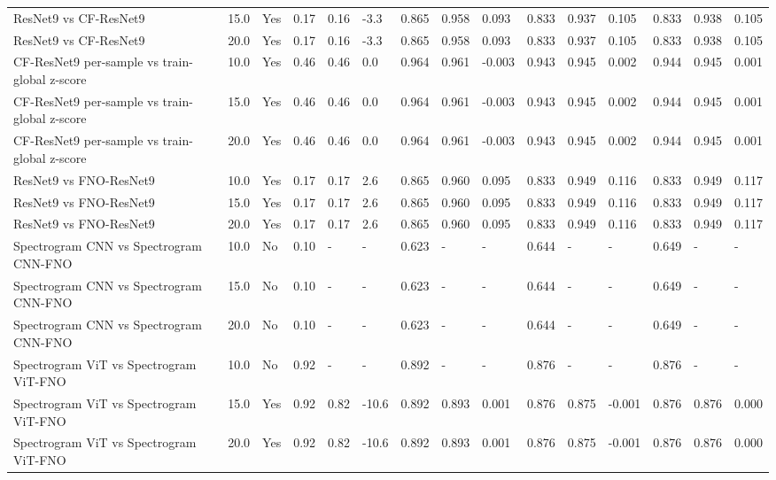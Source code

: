 \begin{longtable}{lllllllllllllll}
ResNet9 vs CF-ResNet9 & 15.0 & Yes & 0.17 & 0.16 & -3.3 & 0.865 & 0.958 & 0.093 & 0.833 & 0.937 & 0.105 & 0.833 & 0.938 & 0.105 \\
ResNet9 vs CF-ResNet9 & 20.0 & Yes & 0.17 & 0.16 & -3.3 & 0.865 & 0.958 & 0.093 & 0.833 & 0.937 & 0.105 & 0.833 & 0.938 & 0.105 \\
CF-ResNet9 per-sample vs train-global z-score & 10.0 & Yes & 0.46 & 0.46 & 0.0 & 0.964 & 0.961 & -0.003 & 0.943 & 0.945 & 0.002 & 0.944 & 0.945 & 0.001 \\
CF-ResNet9 per-sample vs train-global z-score & 15.0 & Yes & 0.46 & 0.46 & 0.0 & 0.964 & 0.961 & -0.003 & 0.943 & 0.945 & 0.002 & 0.944 & 0.945 & 0.001 \\
CF-ResNet9 per-sample vs train-global z-score & 20.0 & Yes & 0.46 & 0.46 & 0.0 & 0.964 & 0.961 & -0.003 & 0.943 & 0.945 & 0.002 & 0.944 & 0.945 & 0.001 \\
ResNet9 vs FNO-ResNet9 & 10.0 & Yes & 0.17 & 0.17 & 2.6 & 0.865 & 0.960 & 0.095 & 0.833 & 0.949 & 0.116 & 0.833 & 0.949 & 0.117 \\
ResNet9 vs FNO-ResNet9 & 15.0 & Yes & 0.17 & 0.17 & 2.6 & 0.865 & 0.960 & 0.095 & 0.833 & 0.949 & 0.116 & 0.833 & 0.949 & 0.117 \\
ResNet9 vs FNO-ResNet9 & 20.0 & Yes & 0.17 & 0.17 & 2.6 & 0.865 & 0.960 & 0.095 & 0.833 & 0.949 & 0.116 & 0.833 & 0.949 & 0.117 \\
Spectrogram CNN vs Spectrogram CNN-FNO & 10.0 & No & 0.10 & - & - & 0.623 & - & - & 0.644 & - & - & 0.649 & - & - \\
Spectrogram CNN vs Spectrogram CNN-FNO & 15.0 & No & 0.10 & - & - & 0.623 & - & - & 0.644 & - & - & 0.649 & - & - \\
Spectrogram CNN vs Spectrogram CNN-FNO & 20.0 & No & 0.10 & - & - & 0.623 & - & - & 0.644 & - & - & 0.649 & - & - \\
Spectrogram ViT vs Spectrogram ViT-FNO & 10.0 & No & 0.92 & - & - & 0.892 & - & - & 0.876 & - & - & 0.876 & - & - \\
Spectrogram ViT vs Spectrogram ViT-FNO & 15.0 & Yes & 0.92 & 0.82 & -10.6 & 0.892 & 0.893 & 0.001 & 0.876 & 0.875 & -0.001 & 0.876 & 0.876 & 0.000 \\
Spectrogram ViT vs Spectrogram ViT-FNO & 20.0 & Yes & 0.92 & 0.82 & -10.6 & 0.892 & 0.893 & 0.001 & 0.876 & 0.875 & -0.001 & 0.876 & 0.876 & 0.000 \\
\end{longtable}
